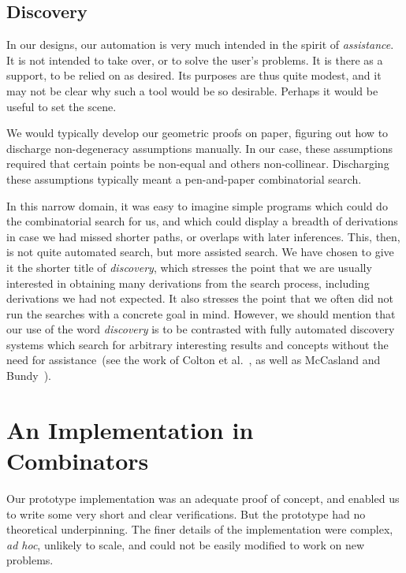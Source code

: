 
\subsection{Discovery}
In our designs, our automation is very much intended in the spirit of \emph{assistance}. It is not intended to take over, or to solve the user's problems. It is there as a support, to be relied on as desired. Its purposes are thus quite modest, and it may not be clear why such a tool would be so desirable. Perhaps it would be useful to set the scene.

We would typically develop our geometric proofs on paper, figuring out how to discharge non-degeneracy assumptions manually. In our case, these assumptions required that certain points be non-equal and others non-collinear. Discharging these assumptions typically meant a pen-and-paper combinatorial search.

In this narrow domain, it was easy to imagine simple programs which could do the combinatorial search for us, and which could display a breadth of derivations in case we had missed shorter paths, or overlaps with later inferences. This, then, is not quite automated search, but more assisted search. We have chosen to give it the shorter title of \emph{discovery}, which stresses the point that we are usually interested in obtaining many derivations from the search process, including derivations we had not expected. It also stresses the point that we often did not run the searches with a concrete goal in mind. However, we should mention that our use of the word \emph{discovery} is to be contrasted with fully automated discovery systems which search for arbitrary interesting results and concepts without the need for assistance~(see the work of Colton et al.~\cite{ColtonInterestingness,MathematicalDiscovery}, as well as McCasland and Bundy~\cite{Mathsaid}).

\section{An Implementation in Combinators}\label{sec:DiscoveryAlgebra}
Our prototype implementation was an adequate proof of concept, and enabled us to write some very short and clear verifications. But the prototype had no theoretical underpinning. The finer details of the implementation were complex, \emph{ad hoc}, unlikely to scale, and could not be easily modified to work on new problems. 

